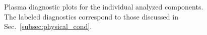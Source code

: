 \documentclass[twocolumn]{aastex63}
\begin{document}
\begin{figure}
  \caption{Plasma diagnostic plots for the individual analyzed components. The labeled diagnostics correspond to those discussed in Sec.~\ref{subsec:physical_cond}.}
\label{fig:plasma}
\end{figure}

























\end{document}
